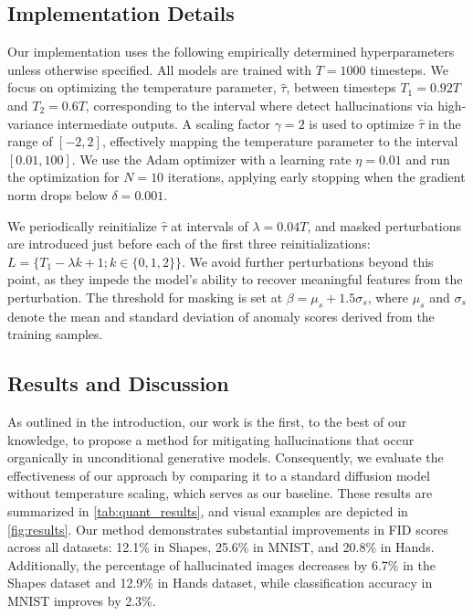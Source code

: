 \subsection{Implementation Details}

Our implementation uses the following empirically determined hyperparameters unless otherwise specified. 
All models are trained with $T=1000$ timesteps. 
We focus on optimizing the temperature parameter, $\hat{\tau}$, between timesteps $T_1 = 0.92T$ and $T_2=0.6T$, corresponding to the interval where \citet{aithal2024understanding} detect hallucinations via high-variance intermediate outputs.
A scaling factor $\gamma=2$ is used to optimize $\hat{\tau}$ in the range of $[-2 , 2]$, effectively mapping the temperature parameter to the interval $[0.01, 100]$.
We use the Adam optimizer \citep{kingma2014adam} with a learning rate $\eta=0.01$ and run the optimization for $N=10$ iterations, applying early stopping when the gradient norm drops below $\delta=0.001$.

We periodically reinitialize $\hat{\tau}$ at intervals of $\lambda = 0.04T$, and masked perturbations are introduced just before each of the first three reinitializations: \ie $L = \{ T_1 - \lambda k + 1 ; k \in \{0,1,2\}\}$. We avoid further perturbations beyond this point, as they impede the model’s ability to recover meaningful features from the perturbation.  
The threshold for masking is set at $\beta = \mu_s + 1.5 \sigma_s$, where $\mu_s$ and $\sigma_s$ denote the mean and standard deviation of anomaly scores derived from the training samples.  

\subsection{Results and Discussion}

As outlined in the introduction, our work is the first, to the best of our knowledge, to propose a method for mitigating hallucinations that occur organically in unconditional generative models. 
Consequently, we evaluate the effectiveness of our approach by comparing it to a standard diffusion model without temperature scaling, which serves as our baseline. 
These results are summarized in \cref{tab:quant_results}, and visual examples are depicted in \cref{fig:results}.
Our method demonstrates substantial improvements in FID scores across all datasets: 12.1\% in Shapes, 25.6\% in MNIST, and 20.8\% in Hands. 
Additionally, the percentage of hallucinated images decreases by 6.7\% in the Shapes dataset and 12.9\% in Hands dataset, while classification accuracy  in MNIST improves by 2.3\%. 


